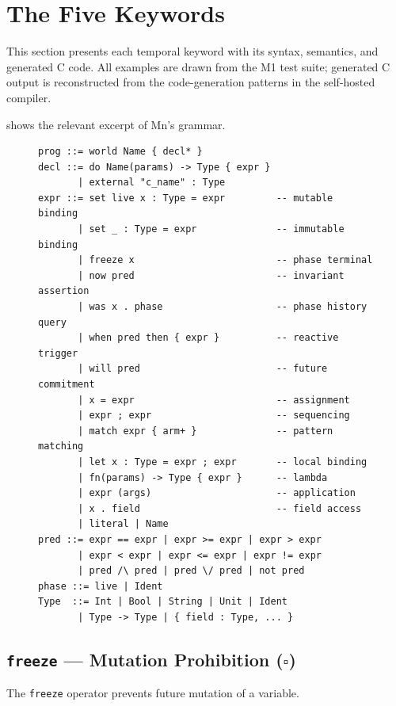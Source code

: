 \documentclass[11pt,a4paper]{article}
\begin{document}
\section{The Five Keywords}
\label{sec:keywords}

This section presents each temporal keyword with its syntax, semantics, and generated C code.
All examples are drawn from the M1 test suite; generated C output is reconstructed from the
code-generation patterns in the self-hosted compiler.

 shows the relevant excerpt of Mn's grammar.

\begin{figure}[t]
\lstset{style=grammar}
\begin{lstlisting}[caption={Mn grammar (temporal keyword excerpt).},label=fig:grammar]
prog ::= world Name { decl* }
decl ::= do Name(params) -> Type { expr }
       | external "c_name" : Type
expr ::= set live x : Type = expr         -- mutable binding
       | set _ : Type = expr              -- immutable binding
       | freeze x                         -- phase terminal
       | now pred                         -- invariant assertion
       | was x . phase                    -- phase history query
       | when pred then { expr }          -- reactive trigger
       | will pred                        -- future commitment
       | x = expr                         -- assignment
       | expr ; expr                      -- sequencing
       | match expr { arm+ }              -- pattern matching
       | let x : Type = expr ; expr       -- local binding
       | fn(params) -> Type { expr }      -- lambda
       | expr (args)                      -- application
       | x . field                        -- field access
       | literal | Name
pred ::= expr == expr | expr >= expr | expr > expr
       | expr < expr | expr <= expr | expr != expr
       | pred /\ pred | pred \/ pred | not pred
phase ::= live | Ident
Type  ::= Int | Bool | String | Unit | Ident
       | Type -> Type | { field : Type, ... }
\end{lstlisting}
\end{figure}

\subsection{\texttt{freeze} --- Mutation Prohibition ($\square$)}
\label{sec:freeze}

The \texttt{freeze} operator prevents future mutation of a variable.
\end{document}
